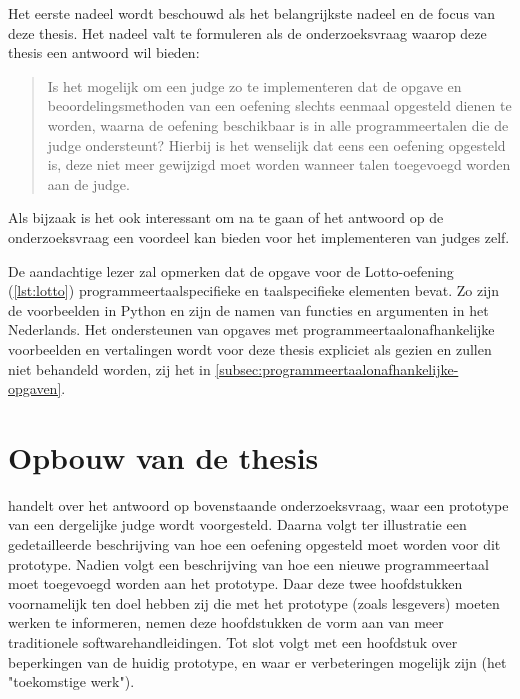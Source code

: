 Het eerste nadeel wordt beschouwd als het belangrijkste nadeel en de focus van deze thesis.
Het nadeel valt te formuleren als de onderzoeksvraag waarop deze thesis een antwoord wil bieden:

\begin{quote}
    Is het mogelijk om een judge zo te implementeren dat de opgave en beoordelingsmethoden van een oefening slechts eenmaal opgesteld dienen te worden, waarna de oefening beschikbaar is in alle programmeertalen die de judge ondersteunt?
    Hierbij is het wenselijk dat eens een oefening opgesteld is, deze niet meer gewijzigd moet worden wanneer talen toegevoegd worden aan de judge.
\end{quote}

Als bijzaak is het ook interessant om na te gaan of het antwoord op de onderzoeksvraag een voordeel kan bieden voor het implementeren van judges zelf.

De aandachtige lezer zal opmerken dat de opgave voor de Lotto-oefening (\cref{lst:lotto}) programmeertaalspecifieke en taalspecifieke elementen bevat.
Zo zijn de voorbeelden in Python en zijn de namen van functies en argumenten in het Nederlands.
Het ondersteunen van opgaves met programmeertaalonafhankelijke voorbeelden en vertalingen wordt voor deze thesis expliciet als  gezien en zullen niet behandeld worden, zij het in \cref{subsec:programmeertaalonafhankelijke-opgaven}.

\section{Opbouw van de thesis}\label{sec:opbouw}

 handelt over het antwoord op bovenstaande onderzoeksvraag, waar een prototype van een dergelijke judge wordt voorgesteld.
Daarna volgt ter illustratie een gedetailleerde beschrijving van hoe een oefening opgesteld moet worden voor dit prototype.
Nadien volgt een beschrijving van hoe een nieuwe programmeertaal moet toegevoegd worden aan het prototype.
Daar deze twee hoofdstukken voornamelijk ten doel hebben zij die met het prototype (zoals lesgevers) moeten werken te informeren, nemen deze hoofdstukken de vorm aan van meer traditionele softwarehandleidingen.
Tot slot volgt met een hoofdstuk over beperkingen van de huidig prototype, en waar er verbeteringen mogelijk zijn (het "toekomstige werk").

